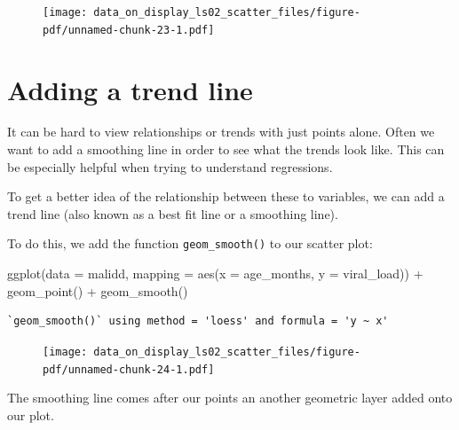 \documentclass[
  letterpaper,
  DIV=11,
  numbers=noendperiod]{scrreprt}
\newenvironment{Shaded}{\begin{snugshade}}{\end{snugshade}}
\newcommand{\AttributeTok}[1]{\textcolor[rgb]{0.40,0.45,0.13}{#1}}
\newcommand{\FunctionTok}[1]{\textcolor[rgb]{0.28,0.35,0.67}{#1}}
\newcommand{\NormalTok}[1]{\textcolor[rgb]{0.00,0.23,0.31}{#1}}
\newcommand{\SpecialCharTok}[1]{\textcolor[rgb]{0.37,0.37,0.37}{#1}}
\begin{document}
\begin{figure}[H]

{\centering \texttt{[image: data\_on\_display\_ls02\_scatter\_files/figure-pdf/unnamed-chunk-23-1.pdf]}

}

\end{figure}

\hypertarget{adding-a-trend-line}{%
\section{Adding a trend line}\label{adding-a-trend-line}}

It can be hard to view relationships or trends with just points alone.
Often we want to add a smoothing line in order to see what the trends
look like. This can be especially helpful when trying to understand
regressions.

To get a better idea of the relationship between these to variables, we
can add a trend line (also known as a best fit line or a smoothing
line).

To do this, we add the function \texttt{geom\_smooth()} to our scatter
plot:

\begin{Shaded}
\begin{Highlighting}[]
\FunctionTok{ggplot}\NormalTok{(}\AttributeTok{data =}\NormalTok{ malidd, }
       \AttributeTok{mapping =} \FunctionTok{aes}\NormalTok{(}\AttributeTok{x =}\NormalTok{ age\_months, }
                     \AttributeTok{y =}\NormalTok{ viral\_load)) }\SpecialCharTok{+} 
  \FunctionTok{geom\_point}\NormalTok{() }\SpecialCharTok{+}
  \FunctionTok{geom\_smooth}\NormalTok{()}
\end{Highlighting}
\end{Shaded}

\begin{verbatim}
`geom_smooth()` using method = 'loess' and formula = 'y ~ x'
\end{verbatim}

\begin{figure}[H]

{\centering \texttt{[image: data\_on\_display\_ls02\_scatter\_files/figure-pdf/unnamed-chunk-24-1.pdf]}

}

\end{figure}

The smoothing line comes after our points an another geometric layer
added onto our plot.
\end{document}

